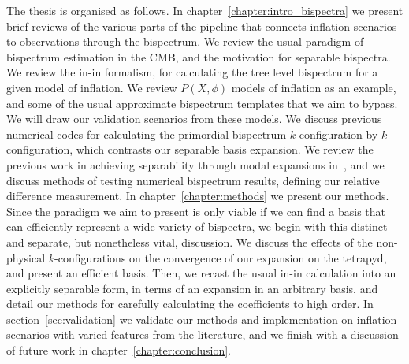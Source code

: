 The thesis is organised as follows. In chapter~\ref{chapter:intro_bispectra} we present brief reviews
of the various parts of the pipeline that connects inflation scenarios to observations
through the bispectrum.
We review the usual paradigm of bispectrum estimation in the CMB,
and the motivation for separable bispectra. We review the in-in formalism,
for calculating the tree level bispectrum for a given model of inflation.
We review $P(X,\phi)$ models of inflation as an example, and
some of the usual approximate bispectrum templates
that we aim to bypass.
We will draw our validation scenarios from these models.
We discuss previous numerical codes for
calculating the primordial bispectrum $k$-configuration by $k$-configuration,
which contrasts our separable basis expansion.
We review the previous work in achieving separability through modal expansions
in~\cite{Funakoshi},
and we discuss methods of testing
numerical bispectrum results, defining our relative difference measurement.
In chapter~\ref{chapter:methods} we present our methods.
Since the paradigm we aim to present is only viable if we can find a basis
that can efficiently represent a wide variety of bispectra,
we begin with this distinct and separate, but nonetheless vital, discussion.
We discuss the effects of the
non-physical $k$-configurations on the convergence of our expansion on
the tetrapyd, and present an efficient basis.
Then, we recast the usual in-in calculation into an explicitly separable form,
in terms of an expansion in an arbitrary basis,
and detail our methods for carefully calculating the coefficients to high order.
In section~\ref{sec:validation} we validate our methods and implementation
on inflation scenarios with varied features from the literature,
and we finish with a discussion of future work in chapter~\ref{chapter:conclusion}.

